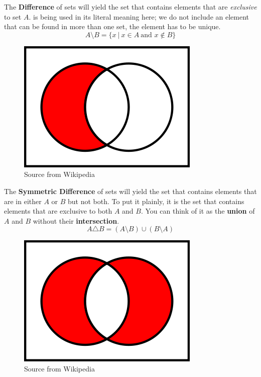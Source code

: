 \documentclass[../setup.tex]{subfiles}
\begin{document}
\begin{theorem}
The \textbf{Difference} of sets will yield the set that contains elements that are \textit{exclusive} to set $A$.  is being used in its literal meaning here; we do not include an element that can be found in more than one set, the element has to be unique.   
\[A\setminus B = \{x\ |\ x\in A\ \text{and } x\notin B \}\]
\begin{figure}[H]
    \centering
    \includegraphics[scale=0.6]{Venn Diagram-Difference.png}
    \caption{Source from Wikipedia}
\end{figure}
\end{theorem}


\begin{theorem}
The \textbf{Symmetric Difference} of sets will yield the set that contains elements that are in either $A$ or $B$ but not both. To put it plainly, it is the set that contains elements that are exclusive to both $A$ and $B$. You can think of it as the \textbf{union} of $A$ and $B$ without their \textbf{intersection}.
\[A \triangle B = (A\setminus B) \cup (B\setminus A)\]
\begin{figure}[H]
    \centering
    \includegraphics[scale=0.6]{Venn Diagram-SymmetricDifference.png}
    \caption{Source from Wikipedia}
\end{figure}
\end{theorem}
\end{document}
